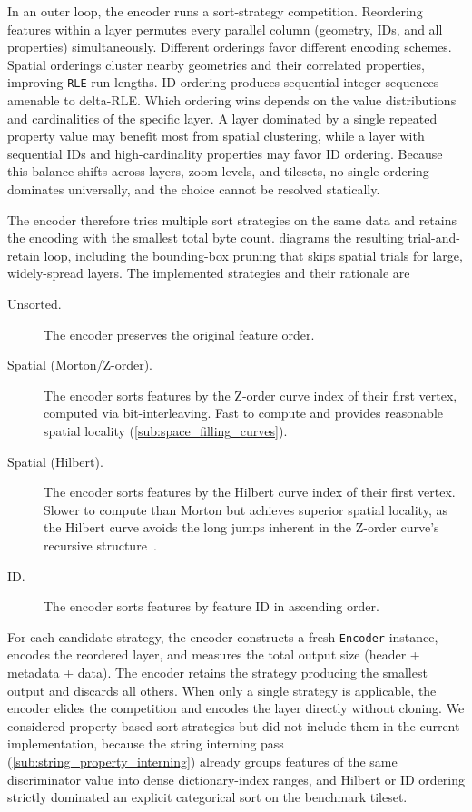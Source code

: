 In an outer loop, the encoder runs a sort-strategy competition.
Reordering features within a layer permutes every parallel column (geometry, IDs, and all properties) simultaneously.
Different orderings favor different encoding schemes.
Spatial orderings cluster nearby geometries and their correlated properties, improving \texttt{\ac{RLE}} run lengths.
ID ordering produces sequential integer sequences amenable to delta-\acs{RLE}.
Which ordering wins depends on the value distributions and cardinalities of the specific layer.
A layer dominated by a single repeated property value may benefit most from spatial clustering, while a layer with sequential IDs and high-cardinality properties may favor ID ordering.
Because this balance shifts across layers, zoom levels, and tilesets, no single ordering dominates universally, and the choice cannot be resolved statically.

The encoder therefore tries multiple sort strategies on the same data and retains the encoding with the smallest total byte count.
 diagrams the resulting trial-and-retain loop, including the bounding-box pruning that skips spatial trials for large, widely-spread layers.
The implemented strategies and their rationale are

\begin{description}
    \item[Unsorted.] The encoder preserves the original feature order.
    \item[Spatial (Morton/Z-order).] The encoder sorts features by the Z-order curve index of their first vertex, computed via bit-interleaving.  Fast to compute and provides reasonable spatial locality (\cref{sub:space_filling_curves}).
    \item[Spatial (Hilbert).] The encoder sorts features by the Hilbert curve index of their first vertex.  Slower to compute than Morton but achieves superior spatial locality, as the Hilbert curve avoids the long jumps inherent in the Z-order curve's recursive structure~\cite{moonAnalysisClusteringProperties2001}.
    \item[ID.] The encoder sorts features by feature ID in ascending order.
\end{description}

For each candidate strategy, the encoder constructs a fresh \texttt{Encoder} instance, encodes the reordered layer, and measures the total output size (header + metadata + data).
The encoder retains the strategy producing the smallest output and discards all others.
When only a single strategy is applicable, the encoder elides the competition and encodes the layer directly without cloning.
We considered property-based sort strategies but did not include them in the current implementation, because the string interning pass (\cref{sub:string_property_interning}) already groups features of the same discriminator value into dense dictionary-index ranges, and Hilbert or ID ordering strictly dominated an explicit categorical sort on the benchmark tileset.

